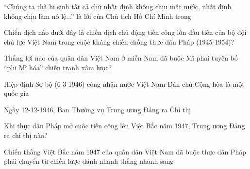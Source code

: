 \documentclass[11pt]{article}
\begin{document}
\begin{vnmultiplechoice}[ rearrange=yes, keycolumns=3]
\begin{question} %
“Chúng ta thà hi sinh tất cả chứ nhất định không chịu mất nước, nhất định
không chịu làm nô lệ...” là lời của Chủ tịch Hồ Chí Minh trong
\datcot[4]
\bonpa
{}
{}
{}
{}
\end{question}

\begin{question} %
Chiến dịch nào dưới đây là chiến dịch chủ động tiến công lớn đầu tiên của bộ
đội chủ lực Việt Nam trong cuộc kháng chiến chống thực dân Pháp (1945-1954)?
\datcot[2]
\bonpa
{}
{}
{}
{}
\end{question}

\begin{question} %
Thắng lợi nào của quân dân Việt Nam ở miền Nam đã buộc Mĩ phải tuyên bố
“phi Mĩ hóa” chiến tranh xâm lược?
\datcot[4]
\bonpa
{}
{}
{}
{}
\end{question}

\begin{question} %
Hiệp định Sơ bộ (6-3-1946) công nhận nước Việt Nam Dân chủ Cộng hòa là
một quốc gia
\datcot
\bonpa
{}
{}
{}
{}
\end{question}

\begin{question} %
Ngày 12-12-1946, Ban Thường vụ Trung ương Đảng ra Chỉ thị
\datcot[2]
\bonpa
{}
{}
{}
{}
\end{question}

\begin{question} %
Khi thực dân Pháp mở cuộc tiến công lên Việt Bắc năm 1947, Trung ương
Đảng ra chỉ thị nào?
\datcot[4]
\bonpa
{}
{}
{}
{}
\end{question}
\begin{question} %
Chiến thắng Việt Bắc năm 1947 của quân dân Việt Nam đã buộc thực dân
Pháp phải chuyển từ chiến lược đánh nhanh thắng nhanh sang
\datcot
\bonpa
{}
{}
{}
{}
\end{question}


\end{vnmultiplechoice}
\end{document}
